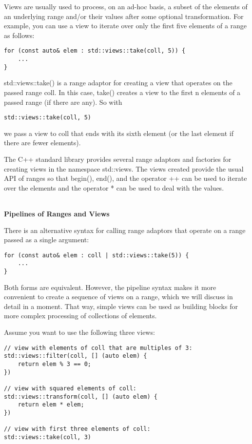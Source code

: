 Views are usually used to process, on an ad-hoc basis, a subset of the elements of an underlying range and/or their values after some optional transformation. For example, you can use a view to iterate over only the first five elements of a range as follows:

\begin{lstlisting}[style=styleCXX]
for (const auto& elem : std::views::take(coll, 5)) {
	...
}
\end{lstlisting}

std::views::take() is a range adaptor for creating a view that operates on the passed range coll. In this case, take() creates a view to the first n elements of a passed range (if there are any). So with

\begin{lstlisting}[style=styleCXX]
std::views::take(coll, 5)
\end{lstlisting}

we pass a view to coll that ends with its sixth element (or the last element if there are fewer elements).

The C++ standard library provides several range adaptors and factories for creating views in the namespace std::views. The views created provide the usual API of ranges so that begin(), end(), and the operator ++ can be used to iterate over the elements and the operator * can be used to deal with the values.

\noindent
\hspace*{\fill} \\ %
\textbf{Pipelines of Ranges and Views}

There is an alternative syntax for calling range adaptors that operate on a range passed as a single argument:

\begin{lstlisting}[style=styleCXX]
for (const auto& elem : coll | std::views::take(5)) {
	...
}
\end{lstlisting}

Both forms are equivalent. However, the pipeline syntax makes it more convenient to create a sequence of views on a range, which we will discuss in detail in a moment. That way, simple views can be used as building blocks for more complex processing of collections of elements.

Assume you want to use the following three views:

\begin{lstlisting}[style=styleCXX]
// view with elements of coll that are multiples of 3:
std::views::filter(coll, [] (auto elem) {
	return elem % 3 == 0;
})

// view with squared elements of coll:
std::views::transform(coll, [] (auto elem) {
	return elem * elem;
})

// view with first three elements of coll:
std::views::take(coll, 3)
\end{lstlisting}

